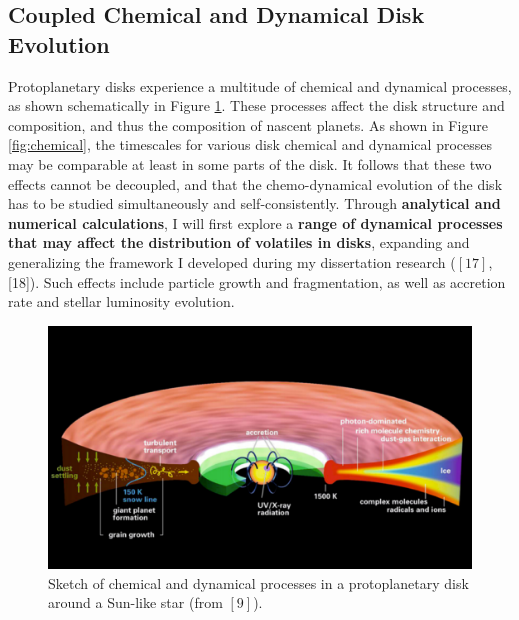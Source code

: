 \documentclass[12pt, letterpaper]{article}
\begin{document}
\subsection{Coupled Chemical and Dynamical Disk Evolution} 

Protoplanetary disks experience a multitude of chemical and dynamical processes, as shown schematically in Figure \ref{fig:disk}. These processes affect the disk structure and composition, and thus the composition of nascent planets. As shown in Figure \ref{fig:chemical}, the timescales for various disk chemical and dynamical processes may be comparable at least in some parts of the disk. It follows that these two effects cannot be decoupled, and that the chemo-dynamical evolution of the disk has to be studied simultaneously and self-consistently. Through \textbf{analytical and numerical calculations}, I will first explore a \textbf{range of dynamical processes that may affect the distribution of volatiles in disks}, expanding and generalizing the framework I developed during my dissertation research ($[17]$, [18]). Such effects include particle growth and fragmentation, as well as accretion rate and stellar luminosity evolution.   

\begin{figure}[h!]
\centering
\includegraphics[width=\textwidth]{disk}
\vspace{-0.1in}
\caption{Sketch of chemical and dynamical processes in a protoplanetary disk around a Sun-like star (from $[9]$).}
\label{fig:disk}
\end{figure}
\end{document}
